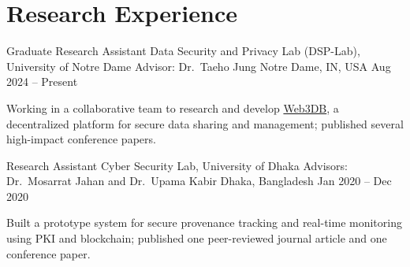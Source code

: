 \documentclass{academic-cv}
\begin{document}
\section{Research Experience}
\begin{cventries}
    \cventry
        {Graduate Research Assistant}
        {Data Security and Privacy Lab (DSP-Lab), University of Notre Dame \newline Advisor: Dr.\ Taeho Jung}
        {Notre Dame, IN, USA}
        {Aug 2024 -- Present}
        \begin{cvitems}
            \item Working in a collaborative team to research and develop \href{https://www.web3db.org/}{Web3DB}, a decentralized platform for secure data sharing and management; published several high-impact conference papers.
        \end{cvitems}
    \cventry
        {Research Assistant}
        {Cyber Security Lab, University of Dhaka \newline Advisors: Dr.\ Mosarrat Jahan and Dr.\ Upama Kabir}
        {Dhaka, Bangladesh}
        {Jan 2020 -- Dec 2020}
        \begin{cvitems}
            \item Built a prototype system for secure provenance tracking and real-time monitoring using PKI and blockchain; published one peer-reviewed journal article and one conference paper.
        \end{cvitems}
\end{cventries}

\end{document}
